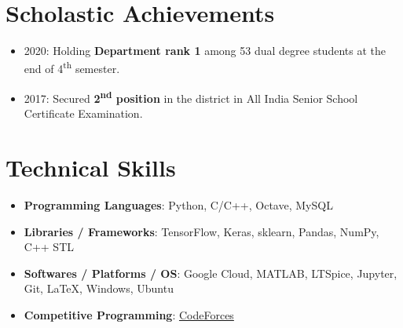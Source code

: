 \documentclass[letterpaper,11pt]{article}
\newcommand{\resumeItem}[2]{
  \item\small{
    \textbf{#1}{: #2 \vspace{-2pt}}
  }
}
\newcommand{\resumeSubItem}[2]{\resumeItem{#1}{#2}\vspace{-4pt}}
\newcommand{\resumeSubHeadingListStart}{\begin{itemize}[leftmargin=*]}
\newcommand{\resumeSubHeadingListEnd}{\end{itemize}}
\begin{document}
\section{Scholastic Achievements}
  \resumeSubHeadingListStart
      \itemsep-0.5em
      \item{2020: Holding \textbf{Department rank 1} among 53 dual degree students at the end of 4\textsuperscript{th} semester.}
      \item{2017: Secured \textbf{2\textsuperscript{nd} position} in the district in All India Senior School Certificate Examination.}
      
  \resumeSubHeadingListEnd
\section{Technical Skills}
  \resumeSubHeadingListStart
    \resumeSubItem{Programming Languages}
      {Python, C/C++, Octave, MySQL}
    \resumeSubItem{Libraries / Frameworks}
      {TensorFlow, Keras, sklearn, Pandas, NumPy, C++ STL}
    \resumeSubItem{Softwares / Platforms / OS}
      {Google Cloud, MATLAB, LTSpice, Jupyter, Git, \LaTeX, Windows, Ubuntu}
    \resumeSubItem{Competitive Programming}
      {\href{https://codeforces.com/profile/QMark}{CodeForces}}
  \resumeSubHeadingListEnd
  
\end{document}
